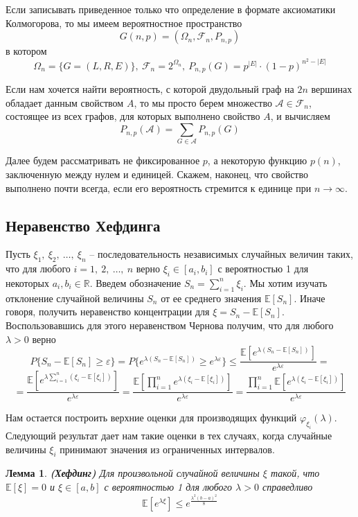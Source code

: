 \documentclass[a4paper]{article}
\newtheorem{mlemma}{Лемма}[section]
\begin{document}
Если записывать приведенное только что определение в формате аксиоматики Колмогорова, то мы имеем 
вероятностное пространство $$G(n, p) = (\Omega_n, \mathcal{F}_n, P_{n,p})$$ в котором 
$$\Omega_n = \{G = (L, R, E)\},\ \mathcal{F}_n = 2^{\Omega_n},\ P_{n,p}(G) = p^{|E|}\cdot(1-p)^{n^2 -|E|}$$

Если нам хочется найти вероятность, с которой двудольный граф на $2n$ вершинах обладает данным свойством $A$, 
то мы просто берем множество $\mathcal{A} \in \mathcal{F}_n$, состоящее из всех графов, для которых 
выполнено свойство $A$, и вычисляем $$P_{n,p}(\mathcal{A}) = \sum\limits_{G\in\mathcal{A}}P_{n,p}(G)$$

Далее будем рассматривать не фиксированное $p$, а некоторую функцию $p(n)$, заключенную между нулем и единицей. 
Скажем, наконец, что свойство выполнено почти всегда, если его вероятность стремится к единице при $n \rightarrow \infty$.

\subsection{Неравенство Хефдинга}

Пусть $\xi_1,\ \xi_2,\ \dots,\ \xi_n$ -- последовательность независимых случайных величин таких, что 
для любого $i = 1,\ 2,\ \ldots,\ n$ верно $\xi_i \in [a_i, b_i]$ с вероятностью 1 для некоторых 
$a_i, b_i \in \mathbb{R}$. Введем обозначение $S_n = \sum\limits_{i = 1}^n\xi_i$. Мы хотим изучать 
отклонение случайной величины $S_n$ от ее среднего значения $\mathbb{E}[S_n]$. Иначе говоря, получить неравенство 
концентрации для $\xi = S_n - \mathbb{E}[S_n]$. Воспользовавшись для этого неравенством Чернова получим, что 
для любого $\lambda > 0$ верно $$P\{S_n - \mathbb{E}[S_n] \geq \varepsilon\} = P\{e^{\lambda(S_n - 
\mathbb{E}[S_n])} \geq e^{\lambda\varepsilon}\} \leq \frac{\mathbb{E}[e^{\lambda(S_n - \mathbb{E}[S_n])}]}{e^{\lambda\varepsilon}} = $$
$$ = \frac{\mathbb{E}[e^{\lambda\sum\limits_{i=1}^n(\xi_i - \mathbb{E}[\xi_i])}]}{e^{\lambda\varepsilon}} = 
\frac{\mathbb{E}[\prod\limits_{i=1}^ne^{\lambda(\xi_i - \mathbb{E}[\xi_i])}]}{e^{\lambda\varepsilon}} = 
\frac{\prod\limits_{i=1}^n\mathbb{E}[e^{\lambda(\xi_i - \mathbb{E}[\xi_i])}]}{e^{\lambda\varepsilon}}$$

Нам остается построить верхние оценки для производящих функций $\varphi_{\xi_i}(\lambda)$. Следующий 
результат дает нам такие оценки в тех случаях, когда случайные величины $\xi_i$ принимают значения 
из ограниченных интервалов.

\begin{mlemma}\emph{\textbf{(Хефдинг)}}
    Для произвольной случайной величины $\xi$ такой, что $\mathbb{E}[\xi] = 0$ и $\xi \in [a, b]$ с вероятностью 1 
    для любого $\lambda > 0$ справедливо $$\mathbb{E}[e^{\lambda\xi}] \leq e^{\frac{\lambda^2(b-a)^2}{8}}$$
\end{mlemma}
\end{document}
